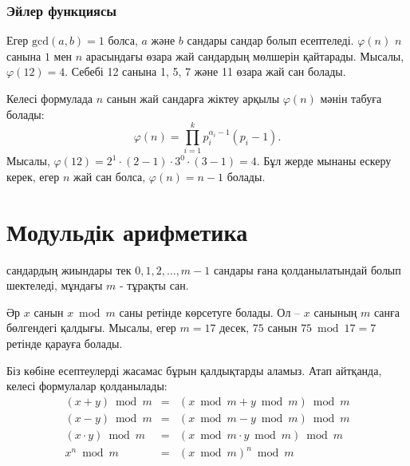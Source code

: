 \subsubsection{Эйлер функциясы}


Егер $\textrm{gcd}(a,b)=1$ болса, $a$ және $b$ сандары  сандар болып есептеледі.  $\varphi(n)$
$n$ санына $1$ мен $n$ арасындағы өзара жай сандардың мөлшерін
қайтарады.
Мысалы, $\varphi(12)=4$. Себебі 12 санына 1, 5, 7 және 11 
өзара жай сан болады.

Келесі формулада $n$ санын жай сандарға жіктеу арқылы
$\varphi(n)$ мәнін табуға болады:
\[ \varphi(n) = \prod_{i=1}^k p_i^{\alpha_i-1}(p_i-1). \]
Мысалы, $\varphi(12)=2^1 \cdot (2-1) \cdot 3^0 \cdot (3-1)=4$.
Бұл жерде мынаны ескеру керек, егер $n$ жай сан болса, $\varphi(n)=n-1$ болады.

\section{Модульдік арифметика}


сандардың жиындары тек $0,1,2,\ldots,m-1$ сандары ғана қолданылатындай болып шектеледі, мұндағы $m$ - тұрақты сан.

Әр $x$ санын $x \bmod m$ саны ретінде көрсетуге
болады. Ол --
$x$ санының $m$ санға бөлгендегі қалдығы.
Мысалы, егер $m=17$ десек, $75$ санын $75 \bmod 17 = 7$
ретінде қарауға болады.

Біз көбіне есептеулерді жасамас бұрын 
қалдықтарды аламыз. Атап айтқанда, келесі 
формулалар қолданылады:
\[
\begin{array}{rcl}
(x+y) \bmod m & = & (x \bmod m + y \bmod m) \bmod m \\
(x-y) \bmod m & = & (x \bmod m - y \bmod m) \bmod m \\
(x \cdot y) \bmod m & = & (x \bmod m \cdot y \bmod m) \bmod m \\
x^n \bmod m & = & (x \bmod m)^n \bmod m \\
\end{array}
\]

